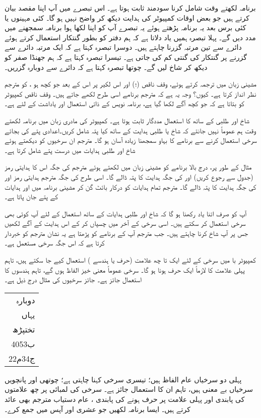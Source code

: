 برنامہ لکھتے وقت شامل کرنا سودمند ثابت ہوتا ہے۔ اس تبصرے میں آپ اپنا مقصد بیان کرتے ہیں جو  بعض اوقات کمپیوٹر کی ہدایت دیکھ کر واضح نہیں ہو گا۔ کئی مہینوں یا کئی برس  بعد یہ برنامہ پڑھتے ہوئے یہ تبصرے آپ کو اپنا لکھا ہوا برنامہ سمجھنے میں مدد دیں گے۔ پہلا تبصرہ ہمیں یاد دلاتا ہے کہ ہم دفتر  کو بطور گنتکار استعمال کرتے ہوئے دائرے سے تین مرتبہ گزرنا چاہتے ہیں۔ دوسرا تبصرہ کہتا ہے  کہ ایک مرتبہ دائرے سے گزرنے پر  گنتکار  کی گنتی کم کی جاتی ہے۔ تیسرا تبصرہ کہتا ہے کہ ہم جھنڈا صفر کو دیکھ کر شاخ  لیں گے۔ چوتھا تبصرہ کہتا ہے کہ دائرے سے دوبارہ گزریں۔

مشینی زبان میں ترجمہ کرتے ہوئے، وقف ناقص (؛)  اور  اس لکیر پر اس کے بعد جو کچھ ہو ، کو مترجم  نظر انداز کرتا ہے۔  کیوں؟ وجہ یہ ہے کہ مترجم برنامے اسی طرح لکھے جاتے ہیں۔ وقف ناقص کمپیوٹر کو بتاتا  ہے کہ جو کچھ  آگے لکھا گیا ہے، برنامہ نویس کے ذاتی استعمال  اور یاداشت کے لئے ہے۔ 

شاخ اور طلبی  کے ساتھ کا استعمال مددگار ثابت ہوتا ہے۔ کمپیوٹر کی مادری زبان میں برنامہ لکھتے وقت  ہم عموماً نہیں جانتے کہ شاخ یا طلبی ہدایت کے ساتھ کیا پتہ شامل کریں۔اعدادی پتے کی بجائے سرخی استعمال کرنے سے  برنامے کا بہاو  سمجھنا  زیادہ  آسان ہو گا۔ مترجم ان سرخیوں کو دیکھتے ہوئے شاخ اور طلبی  ہدایات میں  درست پتے شامل کرتا ہے۔

مثال کے طور پر، درج بالا برنامے کو مشینی زبان میں  لکھتے ہوئے مترجم  \sJZ کی جگہ اس کا ہدایتی رمز   (جدول  سے رجوع کریں)  اور    کی جگہ \sHLT ہدایت کا پتہ ڈالے گا۔ اسی طرح \sJMP کی جگہ مترجم  ہدایتی رمز    اور    کی جگہ   ہدایت \DCR{\regC} کا پتہ ڈالے گا۔ مترجم تمام ہدایات کو درکار بائٹ گن کر    مشینی برنامہ میں   \sHLT اور \sJMP ہدایات کے پتے جان پاتا ہے۔

آپ کو صرف اتنا یاد رکھنا ہو گا کہ شاخ اور طلبی ہدایات کے ساتھ استعمال کے لئے  آپ کوئی بھی  سرخی  استعمال کر سکتے ہیں۔ اسی  سرخی کے آخر میں   چسپاں کر کے  اس ہدایت کے آگے لکھیں جس پر آپ شاخ کرنا  چاہتے ہیں۔ جب مترجم آپ کے برنامے کو پڑھتا ہے یہ نشان  مترجم کو خبردار کرتا ہے کہ اس جگہ سرخی مستعمل ہے۔

کمپیوٹر با میں  سرخی کے لئے ایک  تا  چھ    علامت (حرف یا ہندسے ) استعمال کیے جا سکتے ہیں، تاہم پہلی علامت کا  لازماً ایک  حرف  ہونا ہو گا۔ سرخی عموماً معنی خیز الفاظ ہوں گے،  تاہم ہندسوں کا استعمال جائز ہے۔ جائز سرخیوں کی مثال درج ذیل ہے۔
 \begin{center}
\begin{tabular}{r}
دوبارہ\\ 
یہاں\\
تختپڑھ\\
ب4053\\
ج34م22
\end{tabular}
\end{center}
پہلی دو سرخیاں  عام الفاظ ہیں؛ تیسری سرخی     کہنا چاہتی ہے؛ چوتھی اور پانچویں  سرخیاں بے معنی   ہیں، تاہم ان کا استعمال جائز ہے۔ سرخی کی لمبائی پر چھ علامتوں کی  پابندی اور پہلی علامت    پر  حرف ہونے کی   پابندی  ، عام  دستیاب مترجم    بھی عائد کرتے ہیں۔
ایسا برنامہ لکھیں جو عشری  اور  آپس میں جمع کرے۔

